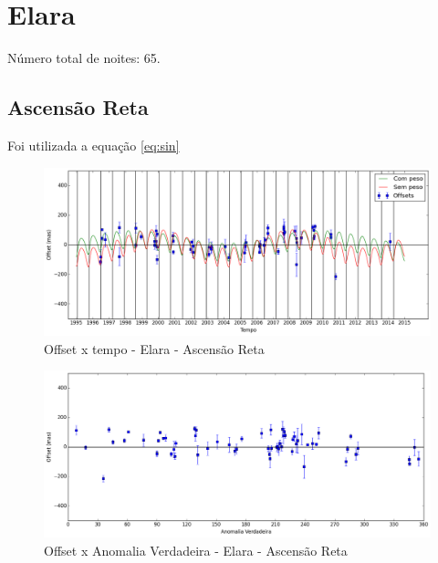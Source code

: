 \documentclass[11pt,a4paper]{report}
\begin{document}
\chapter*{Elara}

\indent \indent Número total de noites: 65.

\section*{Ascensão Reta}

Foi utilizada a equação \ref{eq:sin}

\begin{figure}[h]
\caption{Offset x tempo - Elara - Ascensão Reta}
\includegraphics[scale=0.45]{Elara/RA.png} 
\end{figure}

\begin{figure}[h]
\caption{Offset x Anomalia Verdadeira - Elara - Ascensão Reta}
\includegraphics[scale=0.45]{Elara/RA_anom.png}  
\end{figure}
\end{document}
